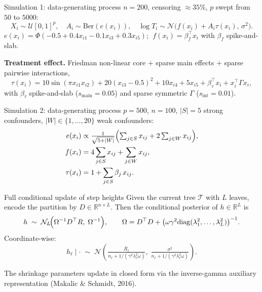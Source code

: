 \documentclass[10pt,aspectratio=169]{beamer}
\newcommand{\T}{\mathcal{T}}
\newcommand{\R}{\mathbb{R}}
\newcommand{\N}{\mathcal{N}}
\begin{document}
\begin{frame}{Simulation 1: data-generating process}
$n = 200$, censoring $\approx 35\%$, $p$ swept from $50$ to $5000$:
\[
X_i \sim \mathcal{U}[0,1]^p,\quad A_i \sim \mathrm{Ber}(e(x_i)),\quad
\log T_i \sim \N\!\bigl(f(x_i) + A_i \tau(x_i),\, \sigma^2\bigr).
\]
$e(x_i) = \Phi(-0.5 + 0.4 x_{i1} - 0.1 x_{i3} + 0.3 x_{i5})$; $\;f(x_i) = \beta_f^\top x_i$ with $\beta_f$ spike-and-slab.

\smallskip
\textbf{Treatment effect.} Friedman non-linear core $+$ sparse main effects $+$ sparse pairwise interactions,
\[
\tau(x_i) = 10\sin(\pi x_{i1} x_{i2}) + 20(x_{i3}-0.5)^2 + 10 x_{i4} + 5 x_{i5} + \beta_\tau^\top x_i + x_i^\top \Gamma x_i,
\]
with $\beta_\tau$ spike-and-slab ($s_{\mathrm{main}} = 0.05$) and sparse symmetric $\Gamma$ ($s_{\mathrm{int}} = 0.01$).
\end{frame}

\begin{frame}{Simulation 2: data-generating process}
$p = 500$, $n = 100$, $|S|=5$ strong confounders, $|W| \in \{1,\ldots,20\}$ weak confounders:
\begin{align*}
e(x_i)    &\propto \tfrac{1}{\sqrt{5+|W|}}\Bigl(\textstyle\sum_{j\in S} x_{ij} + 2 \sum_{j \in W} x_{ij}\Bigr), \\
f(x_i)    &= 4 \sum_{j\in S} x_{ij} + \sum_{j\in W} x_{ij}, \\
\tau(x_i) &= 1 + \sum_{j \in S} \beta_j\, x_{ij}.
\end{align*}
\end{frame}

\begin{frame}{Full conditional update of step heights}
Given the current tree $\T$ with $L$ leaves, encode the partition by $D \in \R^{n \times L}$. Then the conditional posterior of $h \in \R^L$ is
\[
h \;\sim\; \N_L\!\Bigl( \Omega^{-1} D^\top R,\;\Omega^{-1} \Bigr),
\qquad
\Omega = D^\top D + \bigl(\omega \gamma^2 \mathrm{diag}(\lambda_1^2, \ldots, \lambda_L^2)\bigr)^{-1}.
\]
Coordinate-wise:
\[
h_\ell \mid \cdot \;\sim\;
\N\!\left( \tfrac{\bar R_\ell}{n_\ell + 1/(\gamma^2 \lambda_\ell^2 \omega)},\;
            \tfrac{\sigma^2}{n_\ell + 1/(\gamma^2 \lambda_\ell^2 \omega)} \right).
\]

\bigskip

The shrinkage parameters update in closed form via the inverse-gamma auxiliary representation (Makalic \& Schmidt, 2016).
\end{frame}
\end{document}
